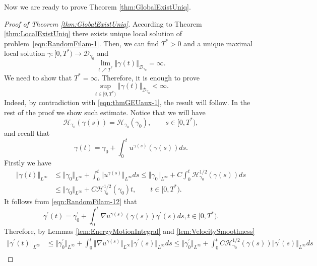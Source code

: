 \documentclass[11pt,a4paper,reqno]{amsart}%
\theoremstyle{plain}
\theoremstyle{remark}
\theoremstyle{plain}
\numberwithin{equation}{section}
\def\liml{\lim\limits}
\def\supl{\sup\limits}
\def\supl{\mathop{\sup}\limits}
\begin{document}
Now we are ready to prove Theorem \ref{thm:GlobalExistUniq}.
\begin{proof}[Proof of Theorem \ref{thm:GlobalExistUniq}]
According to Theorem \ref{thm:LocalExistUniq} there exists unique
local solution of problem~\eqref{eqn:RandomFilam-1}. Then, we can
find $T^*>0$ and a  unique maximal local solution
$\gamma:[0,T^*)\to \mathcal{D}_{\gamma_0}$ and
\begin{equation}
\liml_{t\nearrow T^*}\Vert \gamma(t)\Vert_{\mathcal{D}_{\gamma_0}}=\infty.\label{eqn:thmGEUaux-1}
\end{equation} 
We need
to show that $T^*=\infty$. Therefore, it is enough to prove
$$
\supl_{t\in[0,T^*)}\Vert \gamma(t)\Vert_{\mathcal{D}_{\gamma_0}}<\infty.
$$
Indeed, by contradiction with \eqref{eqn:thmGEUaux-1}, the result
will follow. In the rest of the proof we show such estimate.
Notice that we will have
\begin{equation}
{\mathcal{H}_{\gamma_0}(\gamma(s))}={\mathcal{H}_{\gamma_0}(\gamma_0)},\qquad s\in[0,T^*),\label{eqn:EnergyMotionIntegral-1}
\end{equation}
and
recall that
\begin{equation}
\gamma(t)=\gamma_0+\int_0^tu^{\gamma(s)}(\gamma(s))ds.\label{eqn:RandomFilam-12}
\end{equation}
Firstly we have
\begin{align}
\Vert \gamma(t)\Vert_{L^{\infty}}&\leq\Vert \gamma_0\Vert_{L^{\infty}}+\int_0^t\Vert u^{\gamma(s)}\Vert_{L^{\infty}}ds
\leq\Vert \gamma_0\Vert_{L^{\infty}}+C\int_0^t\mathcal{H}_{\gamma_0}^{1/2}(\gamma(s))ds\nonumber\\
&\leq\Vert \gamma_0\Vert_{L^{\infty}}+C\mathcal{H}_{\gamma_0}^{1/2}(\gamma_0)t,\qquad t\in[0,T^*).\label{eqn:GEUEstim-1}
\end{align}
It follows from \eqref{eqn:RandomFilam-12} that
\begin{equation}
\gamma^\prime(t)=\gamma_0^\prime+\int_0^t\nabla
u^{\gamma(s)}(\gamma(s))\gamma^\prime(s)ds,t\in[0,T^*).\label{eqn:RandomFilam-12'}
\end{equation}
Therefore, by Lemmas \ref{lem:EnergyMotionIntegral} and
\ref{lem:VelocitySmoothness}
\begin{align}
\Vert \gamma^\prime(t)\Vert_{L^{\infty}}&\leq\Vert \gamma^\prime_0\Vert_{L^{\infty}}+\int_0^t\Vert \nabla
u^{\gamma(s)}\Vert_{L^{\infty}}\Vert \gamma^\prime(s)\Vert_{L^{\infty}}ds
\leq\Vert \gamma^\prime_0\Vert_{L^{\infty}}+\int_0^tC\mathcal{H}_{\gamma_0}^{1/2}(\gamma(s))\Vert \gamma^\prime(s)\Vert_{L^{\infty}}ds\nonumber\\

\end{align}
\end{proof}
\end{document}
